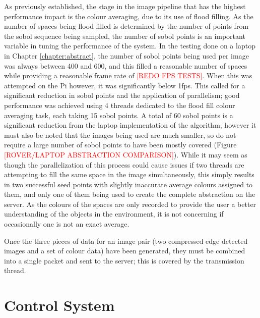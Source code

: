 As previously established, the stage in the image pipeline that has the highest performance impact is the colour averaging, due to its use of flood filling. As the number of spaces being flood filled is determined by the number of points from the sobol sequence being sampled, the number of sobol points is an important variable in tuning the performance of the system. In the testing done on a laptop in Chapter \ref{chapter:abstract}, the number of sobol points being used per image was always between 400 and 600, and this filled a reasonable number of spaces while providing a reasonable frame rate of \textcolor{red}{[REDO FPS TESTS]}. When this was attempted on the Pi however, it was significantly below 1fps. This called for a significant reduction in sobol points and the application of parallelism; good performance was achieved using 4 threads dedicated to the flood fill colour averaging task, each taking 15 sobol points. A total of 60 sobol points is a significant reduction from the laptop implementation of the algorithm, however it must also be noted that the images being used are much smaller, so do not require a large number of sobol points to have been mostly covered (Figure \textcolor{red}{[ROVER/LAPTOP ABSTRACTION COMPARISON]}). While it may seem as though the parallelization of this process could cause issues if two threads are attempting to fill the same space in the image simultaneously, this simply results in two successful seed points with slightly inaccurate average colours assigned to them, and only one of them being used to create the complete abstraction on the server. As the colours of the spaces are only recorded to provide the user a better understanding of the objects in the environment, it is not concerning if occasionally one is not an exact average.

Once the three pieces of data for an image pair (two compressed edge detected images and a set of colour data) have been generated, they must be combined into a single packet and sent to the server; this is covered by the transmission thread.

\section{Control System}